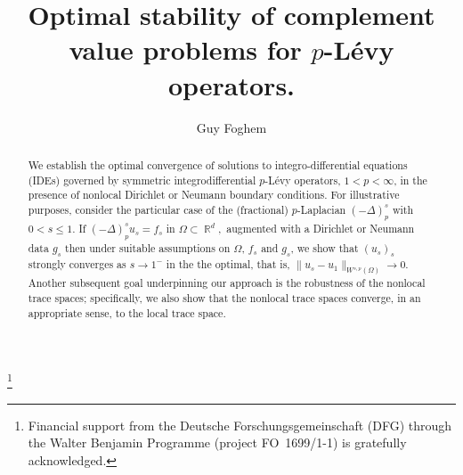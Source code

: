 \documentclass[12pt, reqno]{amsart}%
\theoremstyle{plain}  %
\theoremstyle{definition}  %
\numberwithin{equation}{section}
\DeclareMathOperator{\R}{\mathbb{R}}
\begin{document}
\title{Optimal stability of complement value problems for $p$-L{\'e}vy operators.}


\author{Guy Foghem}
\address{{\tiny Brandenburgische Technische Universit\"at Cottbus--Senftenberg, Fakult\"{a}t 1: MINT Fachgebiet Mathematik, Platz der Deutschen Einheit 1, 03046 Cottbus, Germany.} \href{https://orcid.org/0000-0002-8917-7309}{ORCID}}
\thanks{Financial support from the Deutsche Forschungsgemeinschaft (DFG) through the Walter Benjamin Programme (project FO~1699/1-1) is gratefully acknowledged.}
\begin{abstract}
 We establish the optimal convergence of solutions to integro-differential equations (IDEs) governed by symmetric  integrodifferential $p$-L\'evy operators, $1 < p < \infty$, in the presence of nonlocal Dirichlet or Neumann boundary conditions. For illustrative purposes, consider the particular case of the (fractional) $p$-Laplacian $(-\Delta)^s_p$ with $0 < s \le 1$. If $(-\Delta)^s_p u_s = f_s $ in $\Omega \subset \R^d,$
augmented with a Dirichlet or Neumann data $g_s$ then under suitable assumptions on $\Omega$, $f_s$ and $g_s$,  we show that  $(u_s)_s$ strongly converges  as $s \to 1^-$ in the the optimal, that is, $\|u_s - u_1\|_{W^{s,p}(\Omega)} \to 0$.
\smallskip
Another subsequent goal underpinning our approach is the robustness of the nonlocal trace spaces; specifically, we  also show that the nonlocal trace spaces converge, in an appropriate sense, to the local trace space.
\end{abstract}



\maketitle
\end{document}
